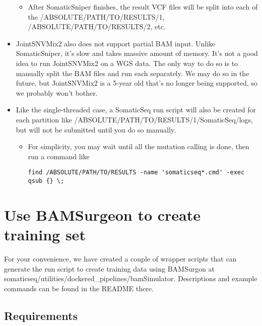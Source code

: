 \documentclass[10pt,letterpaper]{article}
\begin{document}
\begin{sloppypar}
\begin{itemize}
\begin{itemize}
    \item After SomaticSniper finishes, the result VCF files will be split into each of the /ABSOLUTE/PATH/TO/RESULTS/1, /ABSOLUTE/PATH/TO/RESULTS/2, etc.
    \end{itemize}


  \item
  JointSNVMix2 also does not support partial BAM input. Unlike SomaticSniper, it's slow and takes massive amount of memory. It's not a good idea to run JointSNVMix2 on a WGS data. The only way to do so is to manually split the BAM files and run each separately. We may do so in the future, but JointSNVMix2 is a 5-year old that's no longer being supported, so we probably won't bother.

  \item
  Like the single-threaded case, a SomaticSeq run script will also be created for each partition like /ABSOLUTE/PATH/TO/RESULTS/1/SomaticSeq/logs, but will not be submitted until you do so manually.

      
    \begin{itemize}
    \item   
    For simplicity, you may wait until all the mutation calling is done, then run a command like 
    \begin{lstlisting}
find /ABSOLUTE/PATH/TO/RESULTS -name 'somaticseq*.cmd' -exec qsub {} \;
    \end{lstlisting}

    \end{itemize}

\end{itemize}





\section{Use BAMSurgeon to create training set}

For your convenience, we have created a couple of wrapper scripts that can generate the run script to create training data using BAMSurgon at somaticseq/utilities/dockered\_pipelines/bamSimulator. Descriptions and example commands can be found in the README there. 

\subsection{Requirements}

\begin{itemize}


\end{itemize}
\end{sloppypar}
\end{document}
